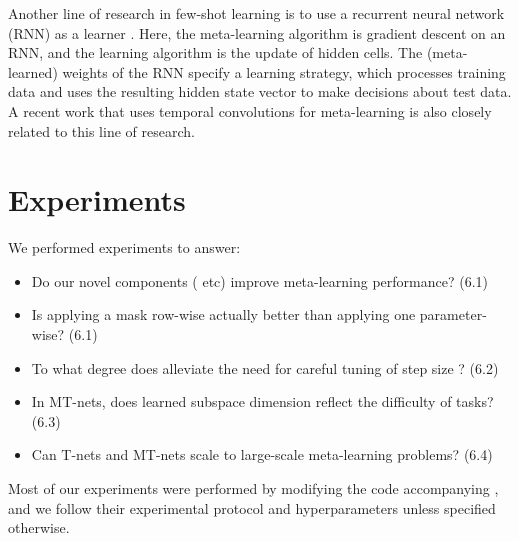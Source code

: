 \documentclass{article}
\newcommand{\0}{{\bf 0}}
\begin{document}
Another line of research in few-shot learning is to use a recurrent neural network (RNN) as a learner \cite{SantoroA2016icml, MunkhdalaiT2017icml}.
Here, the meta-learning algorithm is gradient descent on an RNN, and the learning algorithm is the update of hidden cells.
The (meta-learned) weights of the RNN specify a learning strategy, which processes training data and uses the resulting hidden state vector to make decisions about test data.
A recent work that uses temporal convolutions for meta-learning\cite{Mishra2018iclr} is also closely related to this line of research.

\iffalse
The concept of fast weights\cite{fast} is also related to our method.
The idea here is that in addition to ordinary (slow) weights, having fast weights that rapidly activate and decay can result in robust yet adaptive learning.
This paper gives some evidence from physiology which suggests that similar mechanisms are inside the human brain as well.
\fi


\section{Experiments}
We performed experiments to answer:
\begin{itemize}
\setlength\itemsep{0em}
	\item Do our novel components ( etc) improve meta-learning performance? (6.1)
	\item Is applying a mask  row-wise actually better than applying one parameter-wise? (6.1)
	\item To what degree does  alleviate the need for careful tuning of step size ? (6.2)
	\item In MT-nets, does learned subspace dimension reflect the difficulty of tasks? (6.3)
	\item Can T-nets and MT-nets scale to large-scale meta-learning problems? (6.4)
\end{itemize}

Most of our experiments were performed by modifying the code accompanying \cite{FinnC2017icml},
and we follow their experimental protocol and hyperparameters unless specified otherwise.
\end{document}

